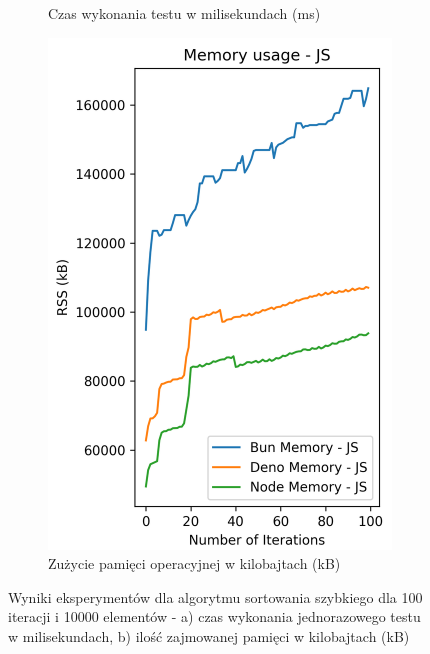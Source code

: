 \begin{figure}[H]
\begin{subfigure}[b]{0.42\textwidth}
    \caption{Czas wykonania testu w milisekundach (ms)}
    \label{fig:quick_sorting_e3_time}
  \end{subfigure}
  \begin{subfigure}[b]{0.42\textwidth}
    \centering
    \includegraphics[width=\textwidth]{Figures/sorting/sorting_quick_100_10000_js_memory.png}
    \caption{Zużycie pamięci operacyjnej w kilobajtach (kB)}
    \label{fig:quick_sorting_e3_memory}
  \end{subfigure}
  \caption{Wyniki eksperymentów dla algorytmu sortowania szybkiego dla 100 iteracji i 10000 elementów - a) czas wykonania jednorazowego testu w milisekundach, b) ilość zajmowanej pamięci w kilobajtach (kB)}
  \label{fig:quick_sorting_e3}
\end{figure}

